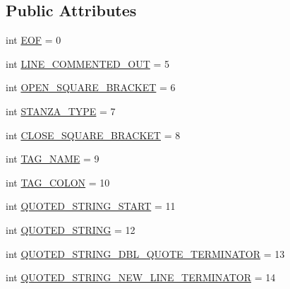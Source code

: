 \subsection*{Public Attributes}
\begin{DoxyCompactItemize}
\item 
int \hyperlink{interfaceorg_1_1coode_1_1owlapi_1_1obo_1_1parser_1_1_o_b_o_parser_constants_a1958959012053aca49f41e9f382d96f7}{E\-O\-F} = 0
\item 
int \hyperlink{interfaceorg_1_1coode_1_1owlapi_1_1obo_1_1parser_1_1_o_b_o_parser_constants_a5ab72fc05d1628e4318abd0c17a24c40}{L\-I\-N\-E\-\_\-\-C\-O\-M\-M\-E\-N\-T\-E\-D\-\_\-\-O\-U\-T} = 5
\item 
int \hyperlink{interfaceorg_1_1coode_1_1owlapi_1_1obo_1_1parser_1_1_o_b_o_parser_constants_a861f31e4d2a1b1b633bf9846ef3ceb03}{O\-P\-E\-N\-\_\-\-S\-Q\-U\-A\-R\-E\-\_\-\-B\-R\-A\-C\-K\-E\-T} = 6
\item 
int \hyperlink{interfaceorg_1_1coode_1_1owlapi_1_1obo_1_1parser_1_1_o_b_o_parser_constants_a77439350a8935023f3a71313a06cb147}{S\-T\-A\-N\-Z\-A\-\_\-\-T\-Y\-P\-E} = 7
\item 
int \hyperlink{interfaceorg_1_1coode_1_1owlapi_1_1obo_1_1parser_1_1_o_b_o_parser_constants_a63b9567bd9572d6a1fb7b95087c3f97e}{C\-L\-O\-S\-E\-\_\-\-S\-Q\-U\-A\-R\-E\-\_\-\-B\-R\-A\-C\-K\-E\-T} = 8
\item 
int \hyperlink{interfaceorg_1_1coode_1_1owlapi_1_1obo_1_1parser_1_1_o_b_o_parser_constants_a3e6106076afadc02f9db7f39903eb542}{T\-A\-G\-\_\-\-N\-A\-M\-E} = 9
\item 
int \hyperlink{interfaceorg_1_1coode_1_1owlapi_1_1obo_1_1parser_1_1_o_b_o_parser_constants_ac7106ffd983781f48daa8cfb98cbe12c}{T\-A\-G\-\_\-\-C\-O\-L\-O\-N} = 10
\item 
int \hyperlink{interfaceorg_1_1coode_1_1owlapi_1_1obo_1_1parser_1_1_o_b_o_parser_constants_a85547f92cd802f09d3101dd807287830}{Q\-U\-O\-T\-E\-D\-\_\-\-S\-T\-R\-I\-N\-G\-\_\-\-S\-T\-A\-R\-T} = 11
\item 
int \hyperlink{interfaceorg_1_1coode_1_1owlapi_1_1obo_1_1parser_1_1_o_b_o_parser_constants_ab5d75d3947c6727acf096ab6b170bd95}{Q\-U\-O\-T\-E\-D\-\_\-\-S\-T\-R\-I\-N\-G} = 12
\item 
int \hyperlink{interfaceorg_1_1coode_1_1owlapi_1_1obo_1_1parser_1_1_o_b_o_parser_constants_a2cea719cde9fc9a515b72b1638ff4929}{Q\-U\-O\-T\-E\-D\-\_\-\-S\-T\-R\-I\-N\-G\-\_\-\-D\-B\-L\-\_\-\-Q\-U\-O\-T\-E\-\_\-\-T\-E\-R\-M\-I\-N\-A\-T\-O\-R} = 13
\item 
int \hyperlink{interfaceorg_1_1coode_1_1owlapi_1_1obo_1_1parser_1_1_o_b_o_parser_constants_accf15d33021263e5597985f2094e8867}{Q\-U\-O\-T\-E\-D\-\_\-\-S\-T\-R\-I\-N\-G\-\_\-\-N\-E\-W\-\_\-\-L\-I\-N\-E\-\_\-\-T\-E\-R\-M\-I\-N\-A\-T\-O\-R} = 14

\end{DoxyCompactItemize}
